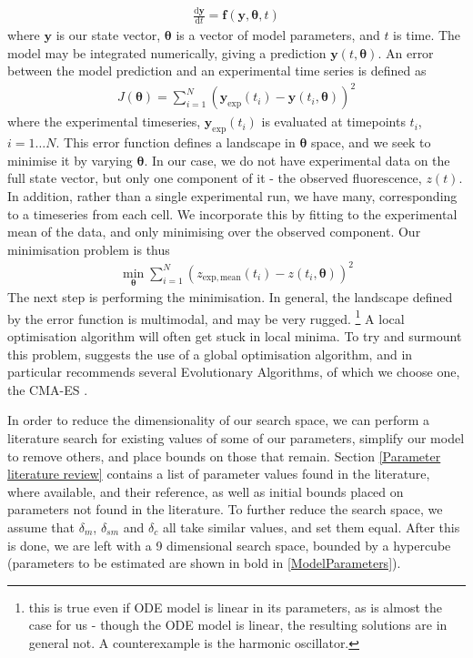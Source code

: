\documentclass[10pt,journal]{./IEEE_latex_class/IEEEtran}
\begin{document}
\begin{align}
\frac{\mathrm{d}\mathbf{y}}{\mathrm{d}t} = \mathbf{f}(\mathbf{y},\boldsymbol{\theta},t)
\end{align}
where $\mathbf{y}$ is our state vector, $\boldsymbol{\theta}$ is a vector of model parameters, and $t$ is time. The model may be integrated numerically, giving a prediction $\mathbf{y}(t,\boldsymbol{\theta})$. An error between the model prediction and an experimental time series is defined as
\begin{align}
J(\boldsymbol{\theta}) = \sum_{i =1}^{N} (\mathbf{y}_{\mathrm{exp}}(t_{i}) - \mathbf{y}(t_{i},\boldsymbol{\theta}))^2
\end{align}
where the experimental timeseries, $\mathbf{y}_{\mathrm{exp}}(t_{i})$ is evaluated at timepoints $t_{i}$, $i = 1 \hdots N$. This error function defines a landscape in $\boldsymbol{\theta}$ space, and we seek to minimise it by varying $\boldsymbol{\theta}$. In our case, we do not have experimental data on the full state vector, but only one component of it - the observed fluorescence, $z(t)$. In addition, rather than a single experimental run, we have many, corresponding to a timeseries from each cell. We incorporate this by fitting to the experimental mean of the data, and only minimising over the observed component. Our minimisation problem is thus
\begin{align}
\min_{\boldsymbol{\theta}} \sum_{i =1}^{N} (z_{\mathrm{exp, mean}}(t_{i}) - z(t_{i},\boldsymbol{\theta}))^2
\end{align}
The next step is performing the minimisation. In general, the landscape defined by the error function is multimodal, and may be very rugged. \footnote{this is true even if ODE model is linear in its parameters, as is almost the case for us - though the ODE model is linear, the resulting solutions are in general not. A counterexample is the harmonic oscillator.} A local optimisation algorithm will often get stuck in local minima. To try and surmount this problem, \cite{Algorithms2003} suggests the use of a global optimisation algorithm, and in particular recommends several Evolutionary Algorithms, of which we choose one, the CMA-ES \cite{Hansen2006,Hansen2011}. 

In order to reduce the dimensionality of our search space, we can perform a literature search for existing values of some of our parameters, simplify our model to remove others, and place bounds on those that remain. Section \ref{Parameter literature review} contains a list of parameter values found in the literature, where available, and their reference, as well as initial bounds placed on parameters not found in the literature. To further reduce the search space, we assume that $\delta_m$, $\delta_{sm}$ and $\delta_c$ all take similar values, and set them equal. After this is done, we are left with a 9 dimensional search space, bounded by a hypercube (parameters to be estimated are shown in bold in \ref{ModelParameters}).
\end{document}
